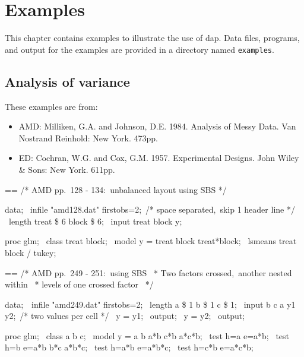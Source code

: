 \documentclass{book}
\makeatletter
\newenvironment{Texinfopreformatted}{%
  \par\GNUTobeylines\obeyspaces\frenchspacing\parskip=\z@\parindent=\z@}{}
{\catcode`\^^M=13 \gdef\GNUTobeylines{\catcode`\^^M=13 \def^^M{\null\par}}}
\newenvironment{Texinfoindented}{\begin{list}{}{}\item\relax}{\end{list}}
\renewcommand{\_}{\Texinfounderscore\discretionary{}{}{}}
\makeatother
\begin{document}
\chapter{{Examples}}
\label{anchor:Examples}%

This chapter contains examples to illustrate the use
of dap. Data files, programs, and output for the examples
are provided in a directory named \texttt{examples}.


\section{{Analysis of variance}}
\label{anchor:Analysis-of-variance-examples}%
%
%

These examples are from:

\begin{itemize}
\item AMD: Milliken, G.A. and Johnson, D.E. 1984.
Analysis of Messy Data.  Van Nostrand Reinhold: New York. 473pp.

\item ED: Cochran, W.G. and Cox, G.M. 1957.
Experimental Designs.  John Wiley \& Sons: New York. 611pp.

\end{itemize}

\begin{Texinfoindented}
\begin{Texinfopreformatted}%
\ttfamily 
/* AMD pp.\ 128 - 134:\ unbalanced layout using SBS  */

data;
\ infile "amd128.dat" firstobs=2;\ /* space separated,\ skip 1 header line */
\ length treat \$ 6 block \$ 6;
\ input treat block y;

proc glm;
\ class treat block;
\ model y = treat block treat*block;
\ lsmeans treat block / tukey;

\end{Texinfopreformatted}
\end{Texinfoindented}

\begin{Texinfoindented}
\begin{Texinfopreformatted}%
\ttfamily /* AMD pp.\ 249 - 251:\ using SBS
\ * Two factors crossed,\ another nested within
\ * levels of one crossed factor
\ */

data;\ 
\ infile "amd249.dat" firstobs=2;
\ length a \$ 1 b \$ 1 c \$ 1;
\ input b c a y1 y2;\ /* two values per cell */
\ y = y1;
\ output;
\ y = y2;
\ output;

proc glm;
\ class a b c;
\ model y = a b a*b c*b a*c*b;
\ test h=a e=a*b;
\ test h=b e=a*b b*c a*b*c;
\ test h=a*b e=a*b*c;
\ test h=c*b e=a*c*b;

\end{Texinfopreformatted}
\end{Texinfoindented}
\end{document}
